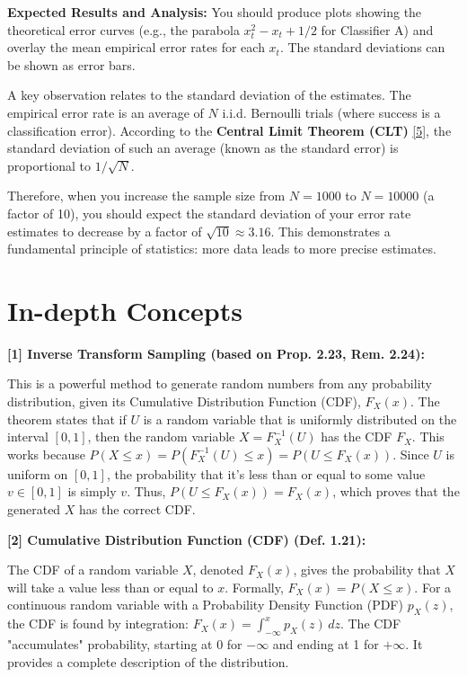 \documentclass[11pt,a4paper]{article}
\begin{document}
\textbf{Expected Results and Analysis:}
You should produce plots showing the theoretical error curves (e.g., the parabola $x_t^2 - x_t + 1/2$ for Classifier A) and overlay the mean empirical error rates for each $x_t$. The standard deviations can be shown as error bars.

A key observation relates to the standard deviation of the estimates. The empirical error rate is an average of $N$ i.i.d. Bernoulli trials (where success is a classification error). According to the \textbf{Central Limit Theorem (CLT)} \hyperlink{concept:clt}{[5]}, the standard deviation of such an average (known as the standard error) is proportional to $1/\sqrt{N}$.

Therefore, when you increase the sample size from $N=1000$ to $N=10000$ (a factor of 10), you should expect the standard deviation of your error rate estimates to decrease by a factor of $\sqrt{10} \approx 3.16$. This demonstrates a fundamental principle of statistics: more data leads to more precise estimates.

\newpage
\section*{In-depth Concepts}
\label{sec:concepts}

\hypertarget{concept:its}{\textbf{[1] Inverse Transform Sampling (based on Prop. 2.23, Rem. 2.24):}}
This is a powerful method to generate random numbers from any probability distribution, given its Cumulative Distribution Function (CDF), $F_X(x)$. The theorem states that if $U$ is a random variable that is uniformly distributed on the interval $[0, 1]$, then the random variable $X = F_X^{-1}(U)$ has the CDF $F_X$. This works because $P(X \le x) = P(F_X^{-1}(U) \le x) = P(U \le F_X(x))$. Since $U$ is uniform on $[0,1]$, the probability that it's less than or equal to some value $v \in [0,1]$ is simply $v$. Thus, $P(U \le F_X(x)) = F_X(x)$, which proves that the generated $X$ has the correct CDF.

\vspace{1em}
\hypertarget{concept:cdf}{\textbf{[2] Cumulative Distribution Function (CDF) (Def. 1.21):}}
The CDF of a random variable $X$, denoted $F_X(x)$, gives the probability that $X$ will take a value less than or equal to $x$. Formally, $F_X(x) = P(X \le x)$. For a continuous random variable with a Probability Density Function (PDF) $p_X(z)$, the CDF is found by integration: $F_X(x) = \int_{-\infty}^x p_X(z) \,dz$. The CDF "accumulates" probability, starting at 0 for $-\infty$ and ending at 1 for $+\infty$. It provides a complete description of the distribution.
\end{document}
